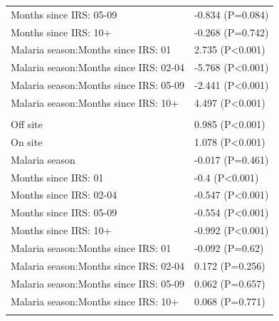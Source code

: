 \documentclass[]{article}
\begin{document}
\begin{table}
\begin{tabular}[t]{ll}
\hspace{1em}Months since IRS: 05-09 & -0.834 (P=0.084)\\
\hspace{1em}Months since IRS: 10+ & -0.268 (P=0.742)\\
\hspace{1em}Malaria season:Months since IRS: 01 & 2.735 (P<0.001)\\
\hspace{1em}Malaria season:Months since IRS: 02-04 & -5.768 (P<0.001)\\
\hspace{1em}Malaria season:Months since IRS: 05-09 & -2.441 (P<0.001)\\
\hspace{1em}Malaria season:Months since IRS: 10+ & 4.497 (P<0.001)\\
\addlinespace[1.5em]
\multicolumn{2}{l}{\textbf{Temporary field worker}}\\
\hspace{1em}Off site & 0.985 (P<0.001)\\
\hspace{1em}On site & 1.078 (P<0.001)\\
\hspace{1em}Malaria season & -0.017 (P=0.461)\\
\hspace{1em}Months since IRS: 01 & -0.4 (P<0.001)\\
\hspace{1em}Months since IRS: 02-04 & -0.547 (P<0.001)\\
\hspace{1em}Months since IRS: 05-09 & -0.554 (P<0.001)\\
\hspace{1em}Months since IRS: 10+ & -0.992 (P<0.001)\\
\hspace{1em}Malaria season:Months since IRS: 01 & -0.092 (P=0.62)\\
\hspace{1em}Malaria season:Months since IRS: 02-04 & 0.172 (P=0.256)\\
\hspace{1em}Malaria season:Months since IRS: 05-09 & 0.062 (P=0.657)\\
\hspace{1em}Malaria season:Months since IRS: 10+ & 0.068 (P=0.771)\\
\addlinespace[1.5em]
\multicolumn{2}{l}{\textbf{Temporary not field worker}}\\

\end{tabular}
\end{table}
\end{document}
